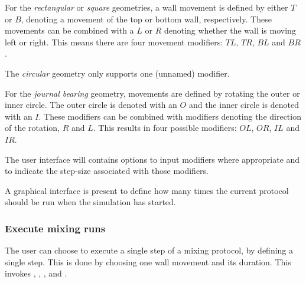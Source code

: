 \fpstartparagraph{} For the \emph{rectangular} or \emph{square} geometries, a wall movement is defined by either $T$ or $B$, denoting a movement of the top or bottom wall, respectively. These movements can be combined with a $L$ or $R$ denoting whether the wall is moving left or right. This means there are four movement modifiers: $TL$, $TR$, $BL$ and $BR$. 

The \emph{circular} geometry only supports one (unnamed) modifier.

For the \emph{journal bearing} geometry, movements are defined by rotating the outer or inner circle. The outer circle is denoted with an $O$ and the inner circle is denoted with an $I$. These modifiers can be combined with modifiers denoting the direction of the rotation, $R$ and $L$. This results in four possible modifiers: $OL$, $OR$, $IL$ and $IR$.

The user interface will contains options to input modifiers where appropriate and to indicate the step-size associated with those modifiers.

\fpstartparagraph{} A graphical interface is present to define how many times the current protocol should be run when the simulation has started.







\subsubsection{Execute mixing runs}
The user can choose to execute a single step of a mixing protocol, by defining a single step. This is done by choosing one wall movement and its duration. This invokes , , ,  and .

